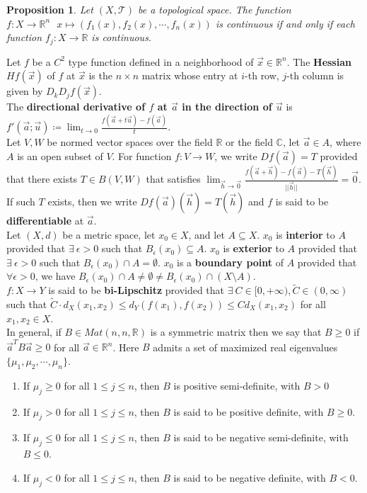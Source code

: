 \documentclass[11pt]{article}
\theoremstyle{break}
\theoremstyle{break}
\newtheorem{prop}[thm]{Proposition}
\newcommand{\R}{\mathbb{R}}
\newcommand{\T}{\mathcal{T}}
\newcommand{\Complex}{\mathbb{C}}
\begin{document}
\begin{prop}
Let $(X,\T)$ be a topological space. The function $f: X\to \R^n \ \ \ x\mapsto (f_1(x),f_2(x),\cdots, f_n(x))$ is continuous if and only if each function $f_j:X \to \R$ is continuous.
\end{prop}

Let $f$ be a $C^2$ type function defined in a neighborhood of $\vec{x}\in \R^n$. The \textbf{Hessian} $Hf(\vec{x})$ of $f$ at $\vec{x}$ is the $n\times n$ matrix whose entry at $i$-th row, $j$-th column is given by $D_kD_jf(\vec{x})$. \\

The \textbf{directional derivative of $f$ at $\vec{a}$ in the direction of $\vec{u}$} is $f'(\vec{a};\vec{u}) \coloneqq \lim_{t\to 0} \frac{f(\vec{a}+t\vec{u})-f(\vec{a})}{t}$.\\

Let $V,W$ be normed vector spaces over the field $\R$ or the field $\Complex$, let $\vec{a}\in A$, where $A$ is an open subset of $V$. For function $f:V \to W$, we write $Df(\vec{a}) = T$ provided that there exists $T \in B(V,W)$ that satisfies $\lim_{\vec{h}\to \vec{0}} \frac{f(\vec{a}+\vec{h})-f(\vec{a})-T(\vec{h})}{||\vec{h}||} = \vec{0}$. If such $T$ exists, then we write $Df(\vec{a})(\vec{h})=T(\vec{h})$ and $f$ is said to be \textbf{differentiable} at $\vec{a}$.\\

Let $(X,d)$ be a metric space, let $x_0 \in X$, and let $A \subseteq X$. $x_0$ is \textbf{interior} to $A$ provided that $\exists\ \epsilon>0$ such that $B_\epsilon(x_0) \subseteq A$. $x_0$ is \textbf{exterior} to $A$ provided that $\exists\ \epsilon>0$ such that $B_\epsilon(x_0) \cap A = \emptyset$. $x_0$ is a \textbf{boundary point} of $A$ provided that $\forall \epsilon>0$, we have $B_\epsilon(x_0)\cap A\neq \emptyset \neq B_\epsilon(x_0)\cap (X\setminus A)$.\\

$f:X \to Y$ is said to be \textbf{bi-Lipschitz} provided that $\exists\ C \in [0,+\infty), \widetilde{C}\in (0,\infty)$ such that $\widetilde{C}\cdot d_X(x_1,x_2) \leq d_Y(f(x_1),f(x_2)) \leq C d_X(x_1,x_2)$ for all $x_1,x_2 \in X$. \\

In general, if $B\in Mat(n,n,\R)$ is a symmetric matrix then we say that $B\geq 0$ if $\vec{a}^TB\vec{a}\geq 0$ for all $\vec{a}\in \R^n$. Here $B$ admits a set of maximized real eigenvalues $\{\mu_1,\mu_2,\cdots,\mu_n\}$.
\begin{enumerate}[topsep=3pt,itemsep=-1ex,partopsep=1ex,parsep=1ex]
\item If $\mu_j \geq 0$ for all $1\leq j \leq n$, then $B$ is positive semi-definite, with $B>0$
\item If $\mu_j > 0$ for all $1\leq j \leq n$, then $B$ is said to be positive definite, with $B \geq 0$.
\item If $\mu_j \leq 0$ for all $1\leq j \leq n$, then $B$ is said to be negative semi-definite, with $B \leq 0$.
\item If $\mu_j < 0$ for all $1\leq j \leq n$, then $B$ is said to be negative definite, with $B < 0$.\\
\end{enumerate}
\end{document}
